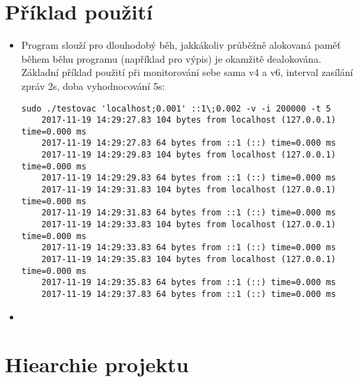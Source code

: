 \documentclass[a4paper,11pt]{article}
\begin{document}
\section*{Příklad použití}
\begin{itemize}
  \item Program slouží pro dlouhodobý běh, jakkákoliv průběžně alokovaná paměť během běhu programu (například pro výpis) je okamžitě dealokována. Základní příklad použití při monitorování sebe sama v4 a v6, interval zasílání zpráv 2s, doba vyhodnocování 5s:

  \lstset{language=Bash}
  \begin{lstlisting}[frame=single,breaklines]
    sudo ./testovac 'localhost;0.001' ::1\;0.002 -v -i 200000 -t 5
    2017-11-19 14:29:27.83 104 bytes from localhost (127.0.0.1) time=0.000 ms
    2017-11-19 14:29:27.83 64 bytes from ::1 (::) time=0.000 ms
    2017-11-19 14:29:29.83 104 bytes from localhost (127.0.0.1) time=0.000 ms
    2017-11-19 14:29:29.83 64 bytes from ::1 (::) time=0.000 ms
    2017-11-19 14:29:31.83 104 bytes from localhost (127.0.0.1) time=0.000 ms
    2017-11-19 14:29:31.83 64 bytes from ::1 (::) time=0.000 ms
    2017-11-19 14:29:33.83 104 bytes from localhost (127.0.0.1) time=0.000 ms
    2017-11-19 14:29:33.83 64 bytes from ::1 (::) time=0.000 ms
    2017-11-19 14:29:35.83 104 bytes from localhost (127.0.0.1) time=0.000 ms
    2017-11-19 14:29:35.83 64 bytes from ::1 (::) time=0.000 ms
    2017-11-19 14:29:37.83 64 bytes from ::1 (::) time=0.000 ms
  \end{lstlisting}
  \item

\end{itemize}

\section*{Hiearchie projektu}
\end{document}
